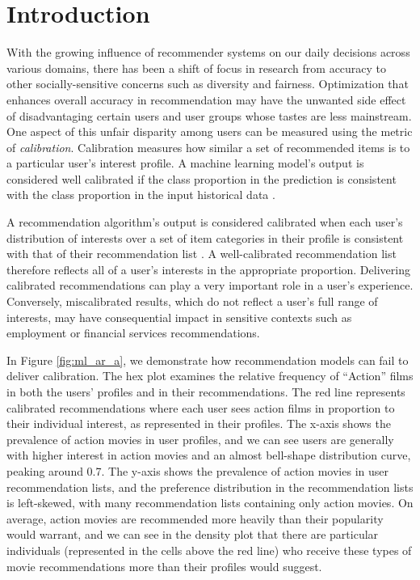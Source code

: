 
\section{Introduction}
With the growing influence of recommender systems on our daily decisions across various domains, there has been a shift of focus in research from accuracy to other socially-sensitive concerns such as diversity and fairness. Optimization that enhances overall accuracy in recommendation may have the unwanted side effect of disadvantaging certain users and user groups whose tastes are less mainstream. One aspect of this unfair disparity among users can be measured using the metric of \textit{calibration}. Calibration measures how similar a set of recommended items is to a particular user's interest profile. A machine learning model's output is considered well calibrated if the class proportion in the prediction is consistent with the class proportion in the input historical data \cite{pleiss2017fairness}. 

A recommendation algorithm's output is considered calibrated when each user's distribution of interests over a set of item categories in their profile is consistent with that of their recommendation list \cite{steck2018calibrated}. A well-calibrated recommendation list therefore reflects all of a user's interests in the appropriate proportion. Delivering calibrated recommendations can play a very important role in a user's experience. Conversely, miscalibrated results, which do not reflect a user's full range of interests, may have consequential impact in sensitive contexts such as employment or financial services recommendations.  

In Figure \ref{fig:ml_ar_a}, we demonstrate how recommendation models can fail to deliver calibration. The hex plot examines the relative frequency of ``Action'' films in both the users' profiles and in their recommendations. The red line represents  calibrated recommendations where each user sees action films in proportion to their individual interest, as represented in their profiles. The x-axis shows the prevalence of action movies in user profiles, and we can see users are generally with higher interest in action movies and an almost bell-shape distribution curve, peaking around 0.7. The y-axis shows the prevalence of action movies in user recommendation lists, and the preference distribution in the recommendation lists is left-skewed, with many recommendation lists containing only action movies. On average, action movies are recommended more heavily than their popularity would warrant, and we can see in the density plot that there are particular individuals (represented in the cells above the red line)  who receive these types of movie recommendations more than their profiles would suggest. 

